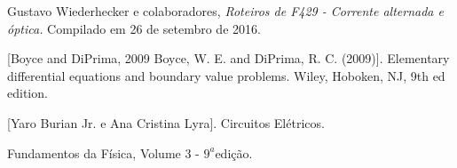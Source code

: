 \documentclass[11pt,a4paper]{article}
\begin{document}
\newpage
%
%
\begin{thebibliography}{10}

Gustavo Wiederhecker e colaboradores, \textsl{Roteiros de F429 - Corrente alternada e óptica.} Compilado em 26 de setembro de 2016.

[Boyce and DiPrima, 2009 Boyce, W. E. and DiPrima, R. C. (2009)]. Elementary differential equations and boundary value problems. Wiley, Hoboken, NJ, 9th ed edition.

[Yaro Burian Jr. e Ana Cristina Lyra]. Circuitos Elétricos.

Fundamentos da Física, Volume 3 - $9^a$edição.

\end{thebibliography}
\end{document}

